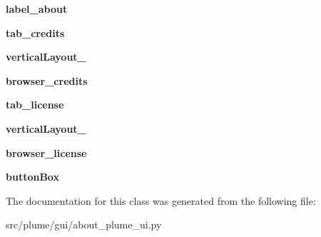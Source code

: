 \begin{DoxyCompactItemize}
\item 
{\bfseries label\+\_\+about}\hypertarget{classplume-creator_1_1src_1_1plume_1_1gui_1_1about__plume__ui_1_1_ui___about_plume_a2e383fd3f45717633605963348cc4eeb}{}\label{classplume-creator_1_1src_1_1plume_1_1gui_1_1about__plume__ui_1_1_ui___about_plume_a2e383fd3f45717633605963348cc4eeb}

\item 
{\bfseries tab\+\_\+credits}\hypertarget{classplume-creator_1_1src_1_1plume_1_1gui_1_1about__plume__ui_1_1_ui___about_plume_a72fbab3bad327f46c8f2cf0721a8fa4e}{}\label{classplume-creator_1_1src_1_1plume_1_1gui_1_1about__plume__ui_1_1_ui___about_plume_a72fbab3bad327f46c8f2cf0721a8fa4e}

\item 
{\bfseries vertical\+Layout\+\_}\hypertarget{classplume-creator_1_1src_1_1plume_1_1gui_1_1about__plume__ui_1_1_ui___about_plume_a5937aee049f4d807e453f04e23693355}{}\label{classplume-creator_1_1src_1_1plume_1_1gui_1_1about__plume__ui_1_1_ui___about_plume_a5937aee049f4d807e453f04e23693355}

\item 
{\bfseries browser\+\_\+credits}\hypertarget{classplume-creator_1_1src_1_1plume_1_1gui_1_1about__plume__ui_1_1_ui___about_plume_afa09b45b27dd63734f9261c6c0294f1a}{}\label{classplume-creator_1_1src_1_1plume_1_1gui_1_1about__plume__ui_1_1_ui___about_plume_afa09b45b27dd63734f9261c6c0294f1a}

\item 
{\bfseries tab\+\_\+license}\hypertarget{classplume-creator_1_1src_1_1plume_1_1gui_1_1about__plume__ui_1_1_ui___about_plume_afa5d73530c21282a2223aeb227a88a5b}{}\label{classplume-creator_1_1src_1_1plume_1_1gui_1_1about__plume__ui_1_1_ui___about_plume_afa5d73530c21282a2223aeb227a88a5b}

\item 
{\bfseries vertical\+Layout\+\_}\hypertarget{classplume-creator_1_1src_1_1plume_1_1gui_1_1about__plume__ui_1_1_ui___about_plume_a2fdd341b879dbca1205124e7bd3a2ed4}{}\label{classplume-creator_1_1src_1_1plume_1_1gui_1_1about__plume__ui_1_1_ui___about_plume_a2fdd341b879dbca1205124e7bd3a2ed4}

\item 
{\bfseries browser\+\_\+license}\hypertarget{classplume-creator_1_1src_1_1plume_1_1gui_1_1about__plume__ui_1_1_ui___about_plume_a8f36e9b7c6bafa6ca3c1d2a869903437}{}\label{classplume-creator_1_1src_1_1plume_1_1gui_1_1about__plume__ui_1_1_ui___about_plume_a8f36e9b7c6bafa6ca3c1d2a869903437}

\item 
{\bfseries button\+Box}\hypertarget{classplume-creator_1_1src_1_1plume_1_1gui_1_1about__plume__ui_1_1_ui___about_plume_a647eb6344b1ec52f475e5ac668a20191}{}\label{classplume-creator_1_1src_1_1plume_1_1gui_1_1about__plume__ui_1_1_ui___about_plume_a647eb6344b1ec52f475e5ac668a20191}

\end{DoxyCompactItemize}


The documentation for this class was generated from the following file\+:\begin{DoxyCompactItemize}
\item 
src/plume/gui/about\+\_\+plume\+\_\+ui.\+py\end{DoxyCompactItemize}
